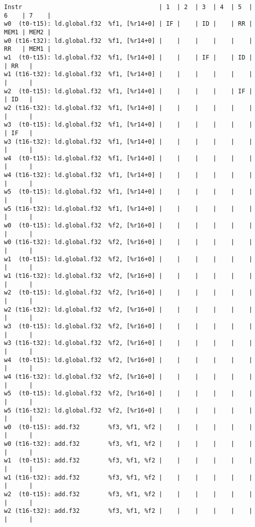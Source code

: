 \documentclass[11pt]{article}
\begin{document}
\begin{Answer}
\begin{verbatim}
Instr                                      | 1  | 2  | 3  | 4  | 5  | 6    | 7    |
w0  (t0-t15): ld.global.f32  %f1, [%r14+0] | IF |    | ID |    | RR | MEM1 | MEM2 |
w0 (t16-t32): ld.global.f32  %f1, [%r14+0] |    |    |    |    |    | RR   | MEM1 |
w1  (t0-t15): ld.global.f32  %f1, [%r14+0] |    |    | IF |    | ID |      | RR   |
w1 (t16-t32): ld.global.f32  %f1, [%r14+0] |    |    |    |    |    |      |      |
w2  (t0-t15): ld.global.f32  %f1, [%r14+0] |    |    |    |    | IF |      | ID   |
w2 (t16-t32): ld.global.f32  %f1, [%r14+0] |    |    |    |    |    |      |      |
w3  (t0-t15): ld.global.f32  %f1, [%r14+0] |    |    |    |    |    |      | IF   |
w3 (t16-t32): ld.global.f32  %f1, [%r14+0] |    |    |    |    |    |      |      |
w4  (t0-t15): ld.global.f32  %f1, [%r14+0] |    |    |    |    |    |      |      |
w4 (t16-t32): ld.global.f32  %f1, [%r14+0] |    |    |    |    |    |      |      |
w5  (t0-t15): ld.global.f32  %f1, [%r14+0] |    |    |    |    |    |      |      |
w5 (t16-t32): ld.global.f32  %f1, [%r14+0] |    |    |    |    |    |      |      |
w0  (t0-t15): ld.global.f32  %f2, [%r16+0] |    |    |    |    |    |      |      |
w0 (t16-t32): ld.global.f32  %f2, [%r16+0] |    |    |    |    |    |      |      |
w1  (t0-t15): ld.global.f32  %f2, [%r16+0] |    |    |    |    |    |      |      |
w1 (t16-t32): ld.global.f32  %f2, [%r16+0] |    |    |    |    |    |      |      |
w2  (t0-t15): ld.global.f32  %f2, [%r16+0] |    |    |    |    |    |      |      |
w2 (t16-t32): ld.global.f32  %f2, [%r16+0] |    |    |    |    |    |      |      |
w3  (t0-t15): ld.global.f32  %f2, [%r16+0] |    |    |    |    |    |      |      |
w3 (t16-t32): ld.global.f32  %f2, [%r16+0] |    |    |    |    |    |      |      |
w4  (t0-t15): ld.global.f32  %f2, [%r16+0] |    |    |    |    |    |      |      |
w4 (t16-t32): ld.global.f32  %f2, [%r16+0] |    |    |    |    |    |      |      |
w5  (t0-t15): ld.global.f32  %f2, [%r16+0] |    |    |    |    |    |      |      |
w5 (t16-t32): ld.global.f32  %f2, [%r16+0] |    |    |    |    |    |      |      |
w0  (t0-t15): add.f32        %f3, %f1, %f2 |    |    |    |    |    |      |      |
w0 (t16-t32): add.f32        %f3, %f1, %f2 |    |    |    |    |    |      |      |
w1  (t0-t15): add.f32        %f3, %f1, %f2 |    |    |    |    |    |      |      |
w1 (t16-t32): add.f32        %f3, %f1, %f2 |    |    |    |    |    |      |      |
w2  (t0-t15): add.f32        %f3, %f1, %f2 |    |    |    |    |    |      |      |
w2 (t16-t32): add.f32        %f3, %f1, %f2 |    |    |    |    |    |      |      |

\end{verbatim}
\end{Answer}
\end{document}
